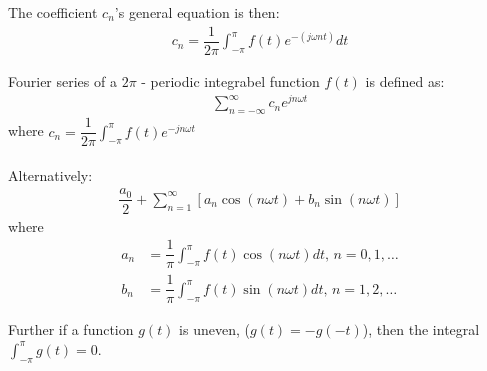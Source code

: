 The coefficient $c_n$'s general equation is then:
\begin{align*}
	c_n = \dfrac{1}{2\pi} \int_{-\pi}^{\pi} f(t) e^{-(j \omega nt)}dt
\end{align*} 
\begin{definition} \label{def:fourier_definition}
Fourier series of a $2\pi$ - periodic integrabel function $f(t)$ is defined as:
\begin{align*}
	\sum_{n=-\infty}^\infty c_n e^{j n \omega t}
\end{align*}
where $c_n = \dfrac{1}{2\pi}\int_{- \pi}^\pi f(t) e^{-j n \omega t}$
\\\\
Alternatively:
\begin{align*}
	\dfrac{a_0}{2} + \sum_{n=1}^{\infty} \left[ a_n \cos(n \omega t) + b_n \sin(n \omega t)\right]
\end{align*} 
where
\begin{align*}
	a_n 
	&= \dfrac{1}{\pi} \int_{-\pi}^\pi f(t) \cos (n \omega t) dt, \, n=0,1,\dots\\
	b_n
	&= \dfrac{1}{\pi} \int_{-\pi}^\pi f(t) \sin (n \omega t) dt, \, n=1,2,\dots	
\end{align*}
\end{definition}
Further if a function $g(t)$ is uneven, ($g(t) = -g(-t)$), then the integral $\int_{-\pi}^\pi g(t) = 0$.
